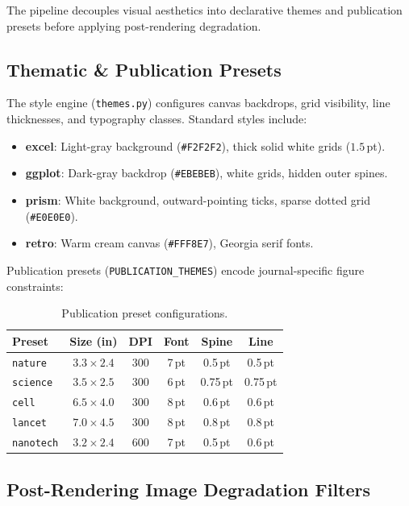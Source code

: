 \documentclass[11pt,twocolumn]{article}
\begin{document}
The pipeline decouples visual aesthetics into declarative themes and publication presets before applying post-rendering degradation.

\subsection{Thematic \& Publication Presets}\label{sec:presets}

The style engine (\texttt{themes.py}) configures canvas backdrops, grid visibility, line thicknesses, and typography classes.
Standard styles include:
\begin{itemize}[nosep]
  \item \textbf{excel}: Light-gray background (\texttt{\#F2F2F2}), thick solid white grids ($1.5\,$pt).
  \item \textbf{ggplot}: Dark-gray backdrop (\texttt{\#EBEBEB}), white grids, hidden outer spines.
  \item \textbf{prism}: White background, outward-pointing ticks, sparse dotted grid (\texttt{\#E0E0E0}).
  \item \textbf{retro}: Warm cream canvas (\texttt{\#FFF8E7}), Georgia serif fonts.
\end{itemize}

Publication presets (\texttt{PUBLICATION\_THEMES}) encode journal-specific figure constraints:

\begin{table}[h!]
\centering
\caption{Publication preset configurations.}\label{tab:pub_presets}
\footnotesize
\begin{tabular}{@{} l c c c c c @{}}
\toprule
\textbf{Preset} & \textbf{Size (in)} & \textbf{DPI} & \textbf{Font} & \textbf{Spine} & \textbf{Line}\\
\midrule
\texttt{nature}  & $3.3\!\times\!2.4$ & 300 & 7\,pt & 0.5\,pt & 0.5\,pt\\
\texttt{science} & $3.5\!\times\!2.5$ & 300 & 6\,pt & 0.75\,pt & 0.75\,pt\\
\texttt{cell}    & $6.5\!\times\!4.0$ & 300 & 8\,pt & 0.6\,pt & 0.6\,pt\\
\texttt{lancet}  & $7.0\!\times\!4.5$ & 300 & 8\,pt & 0.8\,pt & 0.8\,pt\\
\texttt{nanotech} & $3.2\!\times\!2.4$ & 600 & 7\,pt & 0.5\,pt & 0.6\,pt\\
\bottomrule
\end{tabular}
\end{table}

\subsection{Post-Rendering Image Degradation Filters}\label{sec:degradation}
\end{document}
